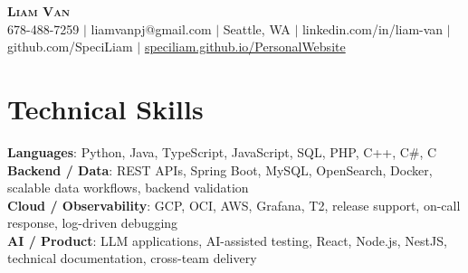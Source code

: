\documentclass[letterpaper,11pt]{article}
\begin{document}

%
\begin{center}
    \textbf{\Huge \scshape Liam Van} \\ \vspace{1pt}
    \small 678-488-7259 $|$ \small {liamvanpj@gmail.com} $|$ Seattle, WA
 {{$|$ linkedin.com/in/liam-van} {$|$ github.com/SpeciLiam} {$|$ \href{https://speciliam.github.io/PersonalWebsite}{speciliam.github.io/PersonalWebsite}}}

\end{center}

\section{Technical Skills}
 \begin{itemize}[leftmargin=0.15in, label={}]
    \small{\item{
     \textbf{Languages}{: Python, Java, TypeScript, JavaScript, SQL, PHP, C++, C\#, C} \\
     \textbf{Backend / Data}{: REST APIs, Spring Boot, MySQL, OpenSearch, Docker, scalable data workflows, backend validation} \\
     \textbf{Cloud / Observability}{: GCP, OCI, AWS, Grafana, T2, release support, on-call response, log-driven debugging} \\
     \textbf{AI / Product}{: LLM applications, AI-assisted testing, React, Node.js, NestJS, technical documentation, cross-team delivery} \\
    }}
 \end{itemize}
%
\end{document}
